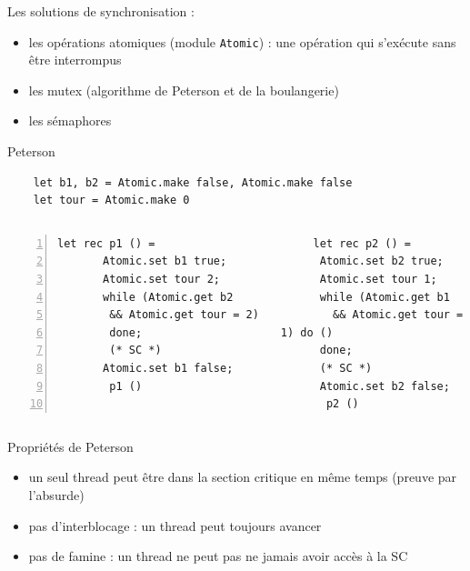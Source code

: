 \begin{frame}
    Les solutions de synchronisation :
    \begin{itemize}[label=\small{}]
        \item les opérations atomiques (module \texttt{Atomic}) : une opération qui s'exécute sans être interrompus
        \item les mutex (algorithme de Peterson et de la boulangerie)
        \item les sémaphores
    \end{itemize}
\end{frame}

\begin{frame}[fragile]{Peterson}
    \begin{lstlisting}
    let b1, b2 = Atomic.make false, Atomic.make false
    let tour = Atomic.make 0
    \end{lstlisting}
    \begin{columns}
    \begin{lstlisting}[numbers=left]
      let rec p1 () =
       Atomic.set b1 true;
       Atomic.set tour 2;
       while (Atomic.get b2
        && Atomic.get tour = 2) do () 
        done;
        (* SC *)
       Atomic.set b1 false;
        p1 ()
       
    \end{lstlisting}
    \begin{lstlisting}
     let rec p2 () =
      Atomic.set b2 true;
      Atomic.set tour 1;
      while (Atomic.get b1 
        && Atomic.get tour = 1) do () 
      done;
      (* SC *) 
      Atomic.set b2 false;
       p2 ()
    \end{lstlisting}
    \end{columns}
\end{frame}

\begin{frame}{Propriétés de Peterson}
    
    \begin{itemize}[label=\small{}]
         \item un seul thread peut être dans la section critique en même temps (preuve par l'absurde)
        \item pas d'interblocage : un thread peut toujours avancer
        \item pas de famine : un thread ne peut pas ne jamais avoir accès à la SC
    \end{itemize}
\end{frame}

